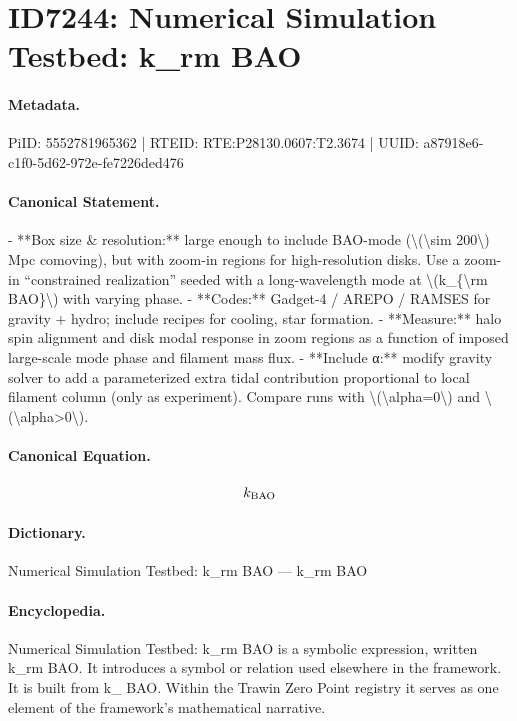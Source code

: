 \section*{ID7244: Numerical Simulation Testbed: k\_rm BAO}
\paragraph{Metadata.}
PiID: 5552781965362 | RTEID: RTE:P28130.0607:T2.3674 | UUID: a87918e6-c1f0-5d62-972e-fe7226ded476

\paragraph{Canonical Statement.}
- **Box size \& resolution:** large enough to include BAO-mode (\textbackslash{}(\textbackslash{}sim 200\textbackslash{}) Mpc comoving), but with zoom-in regions for high-resolution disks. Use a zoom-in “constrained realization” seeded with a long-wavelength mode at \textbackslash{}(k\_\{\textbackslash{}rm BAO\}\textbackslash{}) with varying phase. - **Codes:** Gadget-4 / AREPO / RAMSES for gravity + hydro; include recipes for cooling, star formation. - **Measure:** halo spin alignment and disk modal response in zoom regions as a function of imposed large-scale mode phase and filament mass flux. - **Include α:** modify gravity solver to add a parameterized extra tidal contribution proportional to local filament column (only as experiment). Compare runs with \textbackslash{}(\textbackslash{}alpha=0\textbackslash{}) and \textbackslash{}(\textbackslash{}alpha>0\textbackslash{}).

\paragraph{Canonical Equation.}
\[
k_{\rm BAO}
\]

\paragraph{Dictionary.}
Numerical Simulation Testbed: k\_rm BAO — k\_rm BAO

\paragraph{Encyclopedia.}
Numerical Simulation Testbed: k\_rm BAO is a symbolic expression, written k\_rm BAO. It introduces a symbol or relation used elsewhere in the framework. It is built from k\_ BAO. Within the Trawin Zero Point registry it serves as one element of the framework's mathematical narrative.
